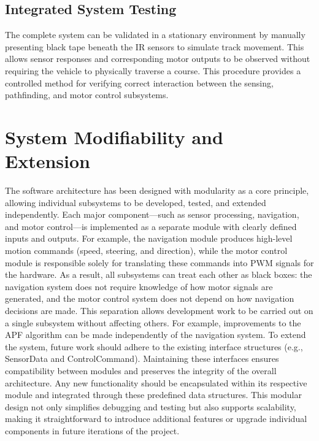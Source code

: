 \subsection{Integrated System Testing}
The complete system can be validated in a stationary environment by manually presenting black tape beneath the IR sensors to simulate track movement. This allows sensor responses and corresponding motor outputs to be observed without requiring the vehicle to physically traverse a course.
This procedure provides a controlled method for verifying correct interaction between the sensing, pathfinding, and motor control subsystems.


\section{System Modifiability and Extension}

The software architecture has been designed with modularity as a core principle, allowing individual subsystems to be developed, tested, and extended independently. Each major component—such as sensor processing, navigation, and motor control—is implemented as a separate module with clearly defined inputs and outputs.
\newline
For example, the navigation module produces high-level motion commands (speed, steering, and direction), while the motor control module is responsible solely for translating these commands into PWM signals for the hardware. As a result, all subsystems can treat each other as black boxes: the navigation system does not require knowledge of how motor signals are generated, and the motor control system does not depend on how navigation decisions are made.
This separation allows development work to be carried out on a single subsystem without affecting others. For example, improvements to the APF algorithm can be made independently of the navigation system.
\newline
To extend the system, future work should adhere to the existing interface structures (e.g., SensorData and ControlCommand). Maintaining these interfaces ensures compatibility between modules and preserves the integrity of the overall architecture. Any new functionality should be encapsulated within its respective module and integrated through these predefined data structures.
\newline
This modular design not only simplifies debugging and testing but also supports scalability, making it straightforward to introduce additional features or upgrade individual components in future iterations of the project.
